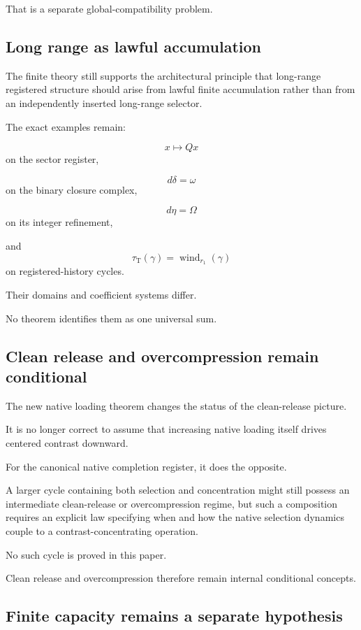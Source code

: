 That is a separate global-compatibility problem.

\subsection{Long range as lawful accumulation}

The finite theory still supports the architectural principle that
long-range registered structure should arise from lawful finite
accumulation rather than from an independently inserted long-range
selector.

The exact examples remain:

\[
x\longmapsto Qx
\]
on the sector register,

\[
d\delta=\omega
\]
on the binary closure complex,

\[
d\eta=\Omega
\]
on its integer refinement,

and
\[
\tau_{\mathrm T}(\gamma)
=
\operatorname{wind}_{r_1}(\gamma)
\]
on registered-history cycles.

Their domains and coefficient systems differ.

No theorem identifies them as one universal sum.

\subsection{Clean release and overcompression remain conditional}

The new native loading theorem changes the status of the clean-release
picture.

It is no longer correct to assume that increasing native loading
itself drives centered contrast downward.

For the canonical native completion register, it does the opposite.

A larger cycle containing both selection and concentration might still
possess an intermediate clean-release or overcompression regime, but
such a composition requires an explicit law specifying when and how
the native selection dynamics couple to a contrast-concentrating
operation.

No such cycle is proved in this paper.

Clean release and overcompression therefore remain internal
conditional concepts.

\subsection{Finite capacity remains a separate hypothesis}


